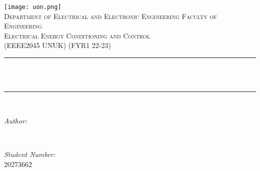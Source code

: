 \begin{titlepage}
    \centering
    \vspace*{0.5 cm}
    \texttt{[image: uon.png]}\\[1.0 cm]	%

    
    \textsc{\Large Department of Electrical and Electronic Engineering
    Faculty of Engineering}\\[2.0 cm]	%
    \textsc{\large Electrical Energy Conditioning and Control}\\[0.5 cm]				%
    \textsc{\large (EEEE2045 UNUK) (FYR1 22-23)}\\[0.5 cm]				%


    \rule{\linewidth}{0.2 mm} \\[0.4 cm]
    { \huge \bfseries \thetitle}\\
    \rule{\linewidth}{0.2 mm} \\[1.5 cm]

    \begin{minipage}{0.4\textwidth}
        \begin{flushleft} \large
            \emph{Author:}\\
            \theauthor
        \end{flushleft}
    \end{minipage}~
    \begin{minipage}{0.4\textwidth}
        \begin{flushright} \large
            \emph{Student Number:} \\
            20273662									%
        \end{flushright}
    \end{minipage}\\[2 cm]

    {\large \thedate}\\[2 cm]

    \vfill

\end{titlepage}